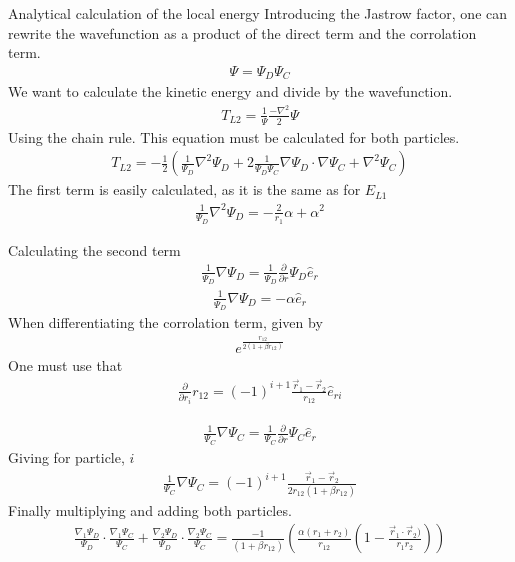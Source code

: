 \documentclass[a4paper, 12pt, titlepage]{article}
\begin{document}
\begin{section}{Analytical calculation of the local energy}
 Introducing the Jastrow factor, one can rewrite the wavefunction
 as a product of the direct term and the corrolation term. 
 \begin{align*}
 	\Psi = \Psi_D \Psi_C
 \end{align*}
 We want to calculate the kinetic energy and divide by the wavefunction.
 \begin{align*}
 	T_{L2} = \frac{1}{\Psi} \frac{-\nabla^2}{2} \Psi
 \end{align*}
 Using the chain rule. This equation must be calculated for both particles. 
 \begin{align}
 	T_{L2} = -\frac{1}{2} \left( \frac{1}{\Psi_D}\nabla^2 \Psi_D + 2 \frac{1}{\Psi_D \Psi_C} \nabla \Psi_D \cdot \nabla \Psi_C + \nabla^2 \Psi_C \right)
 	\label{T_L2}
 \end{align}
 The first term is easily calculated, as it is the same as for $E_{L1}$
 \begin{align*}
 	\frac{1}{\Psi_D}\nabla^2 \Psi_D =  -\frac{2}{r_1}\alpha + \alpha^2 
 \end{align*}

 Calculating the second term
 \begin{align*}
 	\frac{1}{\Psi_D} \nabla \Psi_D = \frac{1}{\Psi_D} \frac{\partial}{\partial r} \Psi_D \hat e_r 
 \end{align*}
 \begin{align}
 	\frac{1}{\Psi_D} \nabla \Psi_D = -\alpha \hat e_r
 \end{align}
 When differentiating the corrolation term, given by
 \begin{align*}
 	e^{\frac{r_{12}}{2\left(1 + \beta r_{12} \right)}}
 \end{align*}
 One must use that
 \begin{align}
 	\frac{\partial}{\partial r_i} r_{12} = (-1)^{i+1} \frac{\vec r_1 - \vec r_2}{r_{12}} \hat e_{ri}
 \end{align}

 \begin{align*}
 	\frac{1}{\Psi_C} \nabla \Psi_C = \frac{1}{\Psi_C} \frac{\partial}{\partial r} \Psi_C \hat e_r 
 \end{align*}
 Giving for particle, $i$
 \begin{align*}
 	\frac{1}{\Psi_C} \nabla \Psi_C = (-1)^{i+1} \frac{\vec r_1 - \vec r_2}{2r_{12} \left(1+\beta r_{12} \right)}
 \end{align*}
 Finally multiplying and adding both particles. 
 \begin{align}
 	\frac{\nabla_1 \Psi_D}{\Psi_D} \cdot \frac{\nabla_1 \Psi_C }{\Psi_C} + \frac{\nabla_2 \Psi_D}{\Psi_D}  \cdot \frac{\nabla_2 \Psi_C}{\Psi_C}  = \frac{-1}{\left(1+\beta r_{12} \right)} \left( \frac{\alpha(r_1 + r_2)}{r_{12}} \left(1 - \frac{\vec r_1 \cdot \vec r_2)}{r_1 r_2} \right)  \right)
 \end{align} 


\end{section}
\end{document}
